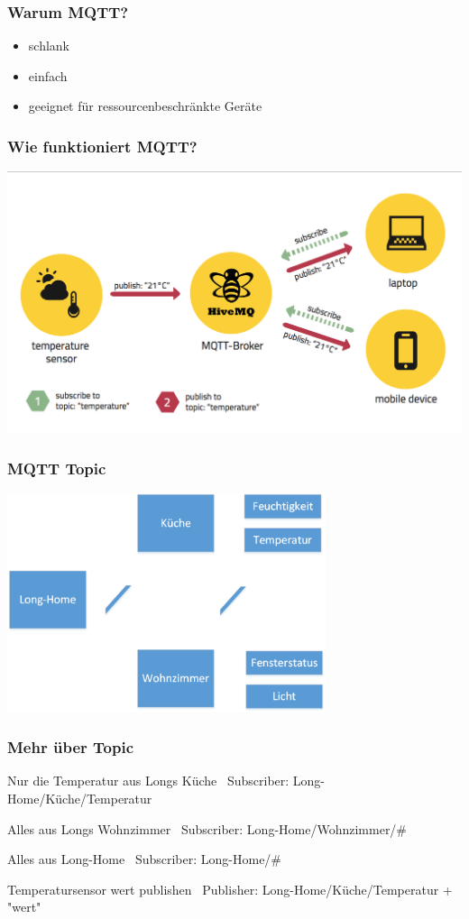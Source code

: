 \documentclass[11pt]{beamer}
\begin{document}
\begin{frame}
	\frametitle{Warum MQTT?} 
	\begin{itemize}
		\item schlank
		\item einfach
		\item geeignet für ressourcenbeschränkte Geräte
	\end{itemize}
\end{frame}

\begin{frame}
	\frametitle{Wie funktioniert MQTT?} 
	\includegraphics[width=1\textwidth]{hivemq.png}
\end{frame}

\begin{frame}
	\frametitle{MQTT Topic}
	\begin{center}
		\includegraphics[width=0.7\textwidth]{mqtttopic.png}
	\end{center}
\end{frame}

\begin{frame}
	\frametitle{Mehr über Topic} 
	\begin{exampleblock}
		{Nur die Temperatur aus Longs Küche} \ Subscriber: Long-Home/Küche/Temperatur
	\end{exampleblock}
	\begin{exampleblock}
		{Alles aus Longs Wohnzimmer} \ Subscriber: Long-Home/Wohnzimmer/\#
	\end{exampleblock}
	\begin{exampleblock}
		{Alles aus Long-Home} \ Subscriber: Long-Home/\#
	\end{exampleblock}
	\begin{exampleblock}
		{Temperatursensor wert publishen} \ Publisher: Long-Home/Küche/Temperatur + "wert"
	\end{exampleblock}
\end{frame}
\end{document}
